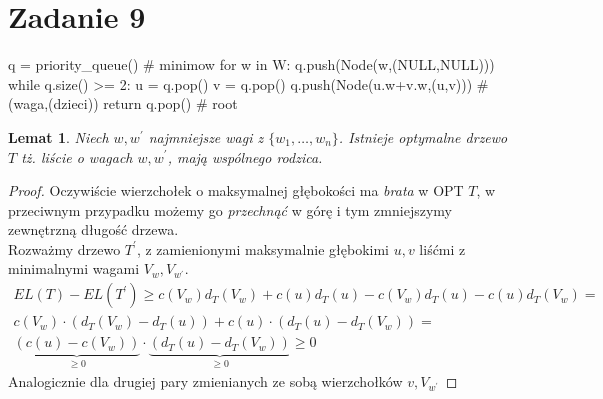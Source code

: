 \documentclass{article}
\newtheorem{lemma}{Lemat}
\begin{document}
\section{Zadanie 9}
\begin{python}
q = priority_queue() # minimow
for w in W:
    q.push(Node(w,(NULL,NULL)))
while q.size() >= 2:
    u = q.pop()
    v = q.pop()
    q.push(Node(u.w+v.w,(u,v))) # (waga,(dzieci))
return q.pop() # root
\end{python}
\begin{lemma}
Niech $w,w^\prime$ najmniejsze wagi z $\{w_1,\ldots,w_n\}$. Istnieje optymalne drzewo $T$ tż. liście o wagach $w,w^\prime$, mają wspólnego rodzica.
\end{lemma}
\begin{proof}
Oczywiście wierzchołek o maksymalnej głębokości ma \textit{brata} w OPT $T$, w przeciwnym przypadku możemy go \textit{przechnąć} w górę i tym zmniejszymy zewnętrzną długość drzewa.\\
Rozważmy drzewo $T^\prime$, z zamienionymi maksymalnie głębokimi $u,v$ liśćmi z minimalnymi wagami $V_{w}, V_{w^\prime}$.\\
\begin{align*}
EL(T) - EL(T^\prime) \geq c(V_w)d_T(V_w) + c(u)d_T(u) - c(V_w)d_T(u) - c(u)d_T(V_w) =\\
 c(V_{w})\cdot (d_T(V_w) - d_T(u)) + c(u)\cdot (d_T(u) - d_T(V_w)) = \\ \underbrace{(c(u) - c(V_w))}_{\geq 0} \cdot \underbrace{(d_T(u) - d_T(V_w))}_{\geq 0} \geq 0
\end{align*}
Analogicznie dla drugiej pary zmienianych ze sobą wierzchołków $v,V_{w^\prime}$
\end{proof}
\end{document}
